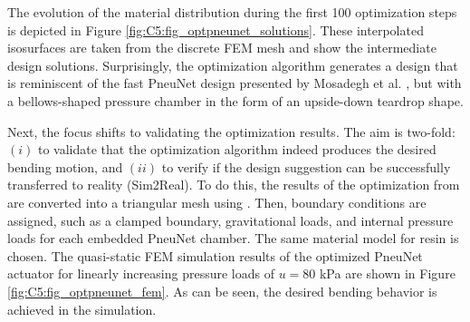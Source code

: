 



The evolution of the material distribution during the first 100 optimization steps is depicted in Figure \ref{fig:C5:fig_optpneunet_solutions}. These interpolated isosurfaces are taken from the discrete FEM mesh and show the intermediate design solutions. Surprisingly, the optimization algorithm generates a design that is reminiscent of the fast PneuNet design presented by Mosadegh et al. \cite{Mosadegh2014}, but with a bellows-shaped pressure chamber in the form of an upside-down teardrop shape.

Next, the focus shifts to validating the optimization results. The aim is two-fold: $(i)$ to validate that the optimization algorithm indeed produces the desired bending motion, and $(ii)$ to verify if the design suggestion can be successfully transferred to reality (Sim2Real). To do this, the results of the optimization from  are converted into a triangular mesh using . Then, boundary conditions are assigned, such as a clamped boundary, gravitational loads, and internal pressure loads for each embedded PneuNet chamber. The same material model for  resin is chosen. The quasi-static FEM simulation results of the optimized PneuNet actuator for linearly increasing pressure loads of $u = 80$ \si{\kilo \pascal} are shown in Figure \ref{fig:C5:fig_optpneunet_fem}. As can be seen, the desired bending behavior is achieved in the simulation.

